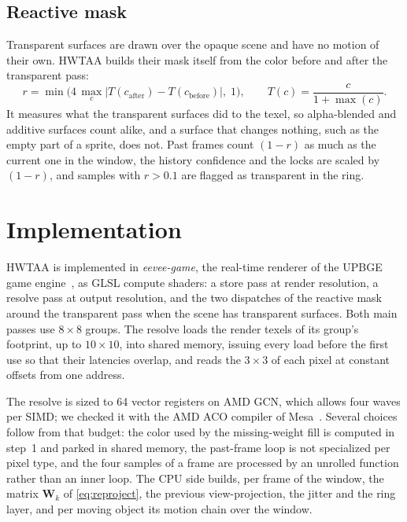 \documentclass[11pt,a4paper]{article}
\begin{document}
\subsection{Reactive mask}
\label{sec:reactive}

Transparent surfaces are drawn over the opaque scene and have no motion of their own. HWTAA builds their mask itself from the color before and after the transparent pass:
\begin{equation}
r = \min\!\big(4\,\max_{c}|T(c_{\mathrm{after}}) - T(c_{\mathrm{before}})|,\; 1\big), \qquad T(c) = \frac{c}{1+\max(c)}.
\end{equation}
It measures what the transparent surfaces did to the texel, so alpha-blended and additive surfaces count alike, and a surface that changes nothing, such as the empty part of a sprite, does not. Past frames count $(1-r)$ as much as the current one in the window, the history confidence and the locks are scaled by $(1-r)$, and samples with $r > 0.1$ are flagged as transparent in the ring.

\section{Implementation}
\label{sec:implementation}

HWTAA is implemented in \emph{eevee-game}, the real-time renderer of the UPBGE game engine~\cite{upbge}, as GLSL compute shaders: a store pass at render resolution, a resolve pass at output resolution, and the two dispatches of the reactive mask around the transparent pass when the scene has transparent surfaces. Both main passes use $8\times8$ groups. The resolve loads the render texels of its group's footprint, up to $10\times10$, into shared memory, issuing every load before the first use so that their latencies overlap, and reads the $3\times3$ of each pixel at constant offsets from one address.

The resolve is sized to 64 vector registers on AMD GCN, which allows four waves per SIMD; we checked it with the AMD ACO compiler of Mesa~\cite{mesa}. Several choices follow from that budget: the color used by the missing-weight fill is computed in step~1 and parked in shared memory, the past-frame loop is not specialized per pixel type, and the four samples of a frame are processed by an unrolled function rather than an inner loop. The CPU side builds, per frame of the window, the matrix $\mathbf{W}_k$ of \cref{eq:reproject}, the previous view-projection, the jitter and the ring layer, and per moving object its motion chain over the window.
\end{document}
